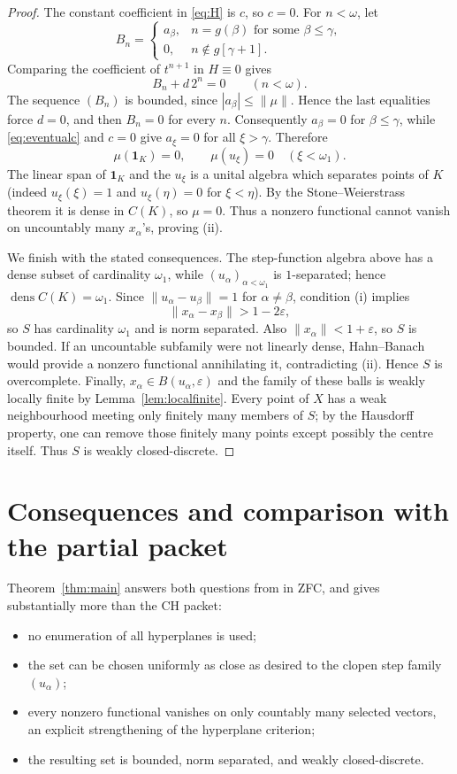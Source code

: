 \documentclass[11pt]{article}
\theoremstyle{remark}
\newcommand{\dens}{\operatorname{dens}}
\newcommand{\one}{\mathbf 1}
\begin{document}
\begin{proof}
The constant coefficient in \eqref{eq:H} is $c$, so $c=0$.  For $n<\omega$,
let
\[
  B_n=
  \begin{cases}
    a_\beta,& n=g(\beta)\text{ for some }\beta\le\gamma,\\
    0,& n\notin g[\gamma+1].
  \end{cases}
\]
Comparing the coefficient of $t^{n+1}$ in $H\equiv0$ gives
\[
  B_n+d\,2^n=0\qquad(n<\omega).
\]
The sequence $(B_n)$ is bounded, since $|a_\beta|\le\|\mu\|$.  Hence the last
equalities force $d=0$, and then $B_n=0$ for every $n$.  Consequently
$a_\beta=0$ for $\beta\le\gamma$, while \eqref{eq:eventualc} and $c=0$ give
$a_\xi=0$ for all $\xi>\gamma$.  Therefore
\[
  \mu(\one_K)=0,
  \qquad
  \mu(u_\xi)=0\quad(\xi<\omega_1).
\]
The linear span of $\one_K$ and the $u_\xi$ is a unital algebra which separates
points of $K$ (indeed $u_\xi(\xi)=1$ and $u_\xi(\eta)=0$ for $\xi<\eta$).
By the Stone--Weierstrass theorem it is dense in $C(K)$, so $\mu=0$.  Thus a
nonzero functional cannot vanish on uncountably many $x_\alpha$'s, proving
(ii).

We finish with the stated consequences.  The step-function algebra above has
a dense subset of cardinality $\omega_1$, while $(u_\alpha)_{\alpha<\omega_1}$
is $1$-separated; hence $\dens C(K)=\omega_1$.  Since
$\|u_\alpha-u_\beta\|=1$ for $\alpha\ne\beta$, condition (i) implies
\[
  \|x_\alpha-x_\beta\|>1-2\varepsilon,
\]
so $S$ has cardinality $\omega_1$ and is norm separated.  Also
$\|x_\alpha\|<1+\varepsilon$, so $S$ is bounded.  If an uncountable
subfamily were not linearly dense, Hahn--Banach would provide a nonzero
functional annihilating it, contradicting (ii).  Hence $S$ is overcomplete.
Finally, $x_\alpha\in B(u_\alpha,\varepsilon)$ and the family of these balls is
weakly locally finite by Lemma~\ref{lem:localfinite}.  Every point of $X$ has a
weak neighbourhood meeting only finitely many members of $S$; by the Hausdorff
property, one can remove those finitely many points except possibly the centre
itself.  Thus $S$ is weakly closed-discrete.
\end{proof}

\section{Consequences and comparison with the partial packet}

Theorem~\ref{thm:main} answers both questions from
\cite[Section 4.1]{RussoSomaglia} in ZFC, and gives substantially more than the
CH packet:
\begin{itemize}[leftmargin=2em]
\item no enumeration of all hyperplanes is used;
\item the set can be chosen uniformly as close as desired to the clopen step
      family $(u_\alpha)$;
\item every nonzero functional vanishes on only countably many selected
      vectors, an explicit strengthening of the hyperplane criterion;
\item the resulting set is bounded, norm separated, and weakly
      closed-discrete.
\end{itemize}
\end{document}
